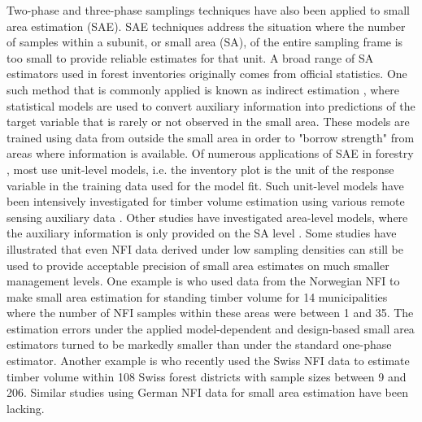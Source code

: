 Two-phase and three-phase samplings techniques have also been applied to small area estimation (SAE). SAE techniques address the situation where the number of samples within a subunit, or small area (SA), of the entire sampling frame is too small to provide reliable estimates for that unit. A broad range of SA estimators used in forest inventories \citep{kohl2006} originally comes from official statistics. One such method that is commonly applied is known as indirect estimation \citep{rao2015}, where statistical models are used to convert auxiliary information into predictions of the target variable that is rarely or not observed in the small area. These models are trained using data from outside the small area in order to "borrow strength" from areas where information is available. Of numerous applications of SAE in forestry \citep{breidenbach2012, goerndt2011, steinmann2013, mandallaz2013b}, most use unit-level models, i.e. the inventory plot is the unit of the response variable in the training data used for the model fit. Such unit-level models have been intensively investigated for timber volume estimation using various remote sensing auxiliary data \citep{koch2010, naesset2014inmaltamo}. Other studies have investigated area-level models, where the auxiliary information is only provided on the SA level \citep{magnussen2017}. Some studies have illustrated that even NFI data derived under low sampling densities can still be used to provide acceptable precision of small area estimates on much smaller management levels. One example is \citet{breidenbach2012} who used data from the Norwegian NFI to make small area estimation for standing timber volume for 14 municipalities where the number of NFI samples within these areas were between 1 and 35. The estimation errors under the applied model-dependent and design-based small area estimators turned to be markedly smaller than under the standard one-phase estimator. Another example is \citet{magnussen2014} who recently used the Swiss NFI data to estimate timber volume within 108 Swiss forest districts with sample sizes between 9 and 206. Similar studies using German NFI data for small area estimation have been lacking.\par


